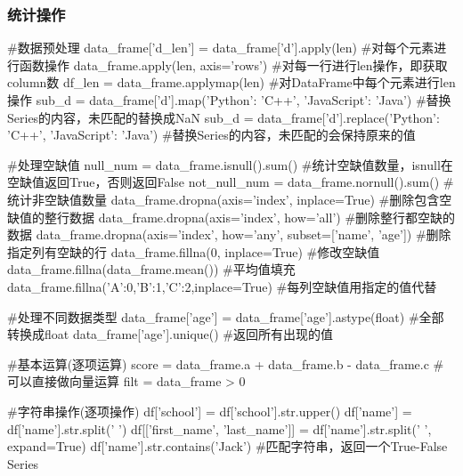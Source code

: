     \subsubsection{统计操作}
      \begin{codeblock}[language=python, caption={Perform statistical operations using DataFrame}]
        #数据预处理
        data_frame['d_len'] = data_frame['d'].apply(len) #对每个元素进行函数操作
        data_frame.apply(len, axis='rows') #对每一行进行len操作，即获取column数
        df_len = data_frame.applymap(len) #对DataFrame中每个元素进行len操作
        sub_d = data_frame['d'].map({'Python': 'C++', 'JavaScript': 'Java'}) 
            #替换Series的内容，未匹配的替换成NaN
        sub_d = data_frame['d'].replace({'Python': 'C++', 'JavaScript': 'Java'}) 
            #替换Series的内容，未匹配的会保持原来的值

        #处理空缺值
        null_num = data_frame.isnull().sum() #统计空缺值数量，isnull在空缺值返回True，否则返回False
        not_null_num = data_frame.nornull().sum() #统计非空缺值数量
        data_frame.dropna(axis='index', inplace=True) #删除包含空缺值的整行数据
        data_frame.dropna(axis='index', how='all') #删除整行都空缺的数据
        data_frame.dropna(axis='index', how='any', subset=['name', 'age']) #删除指定列有空缺的行
        data_frame.fillna(0, inplace=True) #修改空缺值
        data_frame.fillna(data_frame.mean()) #平均值填充
        data_frame.fillna({'A':0,'B':1,'C':2},inplace=True) #每列空缺值用指定的值代替

        #处理不同数据类型
        data_frame['age'] = data_frame['age'].astype(float) #全部转换成float
        data_frame['age'].unique() #返回所有出现的值

        #基本运算(逐项运算)
        score = data_frame.a + data_frame.b - data_frame.c #可以直接做向量运算
        filt = data_frame > 0

        #字符串操作(逐项操作)
        df['school'] = df['school'].str.upper()
        df['name'] = df['name'].str.split(' ') 
        df[['first_name', 'last_name']] = df['name'].str.split(' ', expand=True)
        df['name'].str.contains('Jack') #匹配字符串，返回一个True-False Series


\end{codeblock}
